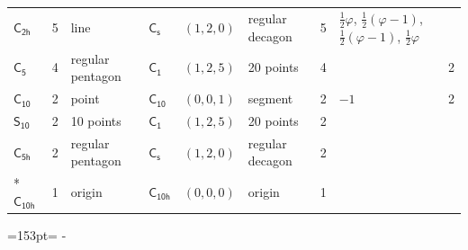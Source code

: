 \documentclass[10pt,a4paper]{article}
\newcommand{\needspace}[1]{\par\penalty-100\begingroup\dimen0=#1\relax\dimen2=\pagegoal
  \advance\dimen2-\pagetotal\ifdim\dimen0>\dimen2\relax\ifdim\dimen2>0pt\vfil\break\fi\fi
  \endgroup}
\numberwithin{equation}{section}
\newcommand{\grp}[1]{\mathsf{#1}}
\newcommand{\goldenratio}{\varphi}
\newlength{\fillwidth}\newlength{\cellwidth}\newlength{\colwidth}
\begin{document}
{{\begin{longtable}{@{}lrllllr>{\RaggedRight\arraybackslash}p{\fillwidth}r@{}}
\href{C2h.pdf}{$\grp{C_{2h}}$} & 5 & line & \href{C1v.pdf}{$\grp{C_{s}}$} & $(1, 2, 0)$ & regular decagon & 5 & ${\tfrac{1}{2}\goldenratio{}}$, ${\tfrac{1}{2}(\goldenratio - 1)}$, ${\tfrac{1}{2}(\goldenratio - 1)}$, ${\tfrac{1}{2}\goldenratio{}}$ & \\
\href{C5.pdf}{$\grp{C_{5}}$} & 4 & regular pentagon & \href{C1.pdf}{$\grp{C_{1}}$} & $(1, 2, 5)$ & 20 points & 4 &  & 2\\
\href{C10.pdf}{$\grp{C_{10}}$} & 2 & point & \href{C10.pdf}{$\grp{C_{10}}$} & $(0, 0, 1)$ & segment & 2 & ${-1}$ & 2\\
\href{S10.pdf}{$\grp{S_{10}}$} & 2 & 10 points & \href{C1.pdf}{$\grp{C_{1}}$} & $(1, 2, 5)$ & 20 points & 2 &  & \\
\href{C5h.pdf}{$\grp{C_{5h}}$} & 2 & regular pentagon & \href{C1v.pdf}{$\grp{C_{s}}$} & $(1, 2, 0)$ & regular decagon & 2 &  & \\*
\href{C10h.pdf}{$\grp{C_{10h}}$} & 1 & origin & \href{C10h.pdf}{$\grp{C_{10h}}$} & $(0, 0, 0)$ & origin & 1 &  & \\
\bottomrule\end{longtable}}}
\needspace{153pt}
\end{document}
